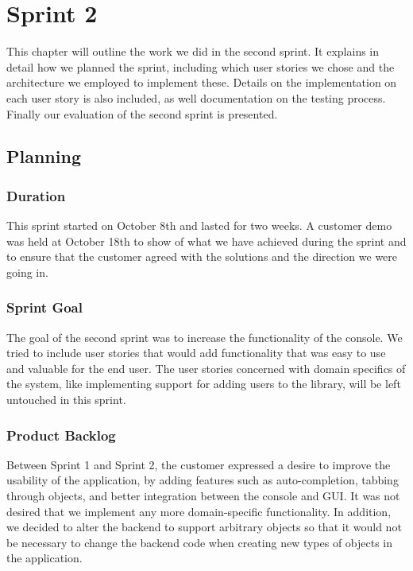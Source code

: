 \chapter{Sprint 2}

\minitoc

This chapter will outline the work we did in the second sprint. It explains in detail how we planned the sprint, including which user stories we chose and the architecture we employed to implement these. Details on the implementation on each user story is also included, as well documentation on the testing process. Finally our evaluation of the second sprint is presented. 

\clearpage

\section{Planning}

\subsection{Duration}
This sprint started on October 8th and lasted for two weeks. A customer demo was held at October 18th to show of what we have achieved during the sprint and to ensure that the customer agreed with the solutions and the direction we were going in.

\subsection{Sprint Goal}
The goal of the second sprint was to increase the functionality of the console. We tried to include user stories that would add functionality that was easy to use and valuable for the end user. The user stories concerned with domain specifics of the system, like implementing support for adding users to the library, will be left untouched in this sprint.

\subsection{Product Backlog} 
Between Sprint 1 and Sprint 2, the customer expressed a desire to improve the usability of the application, by adding features such as auto-completion, tabbing through objects, and better integration between the console and GUI. It was not desired that we implement any more domain-specific functionality. In addition, we decided to alter the backend to support arbitrary objects so that it would not be necessary to change the backend code when creating new types of objects in the application. 

